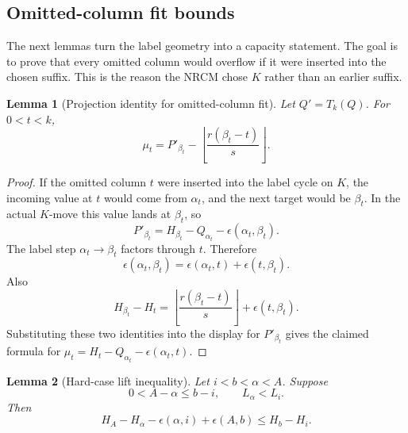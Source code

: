 \documentclass[10pt]{article}
\newtheorem{lemma}{Lemma}
\begin{document}
\subsection*{Omitted-column fit bounds}

The next lemmas turn the label geometry into a capacity statement.  The goal
is to prove that every omitted column would overflow if it were inserted into
the chosen suffix.  This is the reason the NRCM chose \(K\) rather than an
earlier suffix.

\begin{lemma}[Projection identity for omitted-column fit]
Let \(Q'=T_k(Q)\).  For \(0<t<k\),
\[
  \mu_t
  =
  P'_{\beta_t}
  -
  \left\lfloor\frac{r(\beta_t-t)}s\right\rfloor .
\]
\end{lemma}

\begin{proof}
If the omitted column \(t\) were inserted into the label cycle on \(K\), the
incoming value at \(t\) would come from \(\alpha_t\), and the next target would
be \(\beta_t\).  In the actual \(K\)-move this value lands at \(\beta_t\), so
\[
  P'_{\beta_t}
  =
  H_{\beta_t}-Q_{\alpha_t}-\epsilon(\alpha_t,\beta_t).
\]
The label step \(\alpha_t\to\beta_t\) factors through \(t\).  Therefore
\[
  \epsilon(\alpha_t,\beta_t)
  =
  \epsilon(\alpha_t,t)+\epsilon(t,\beta_t).
\]
Also
\[
  H_{\beta_t}-H_t
  =
  \left\lfloor\frac{r(\beta_t-t)}s\right\rfloor
  +
  \epsilon(t,\beta_t).
\]
Substituting these two identities into the display for \(P'_{\beta_t}\) gives
the claimed formula for \(\mu_t=H_t-Q_{\alpha_t}-\epsilon(\alpha_t,t)\).
\end{proof}

\begin{lemma}[Hard-case lift inequality]
Let \(i<b<\alpha<A\).  Suppose
\[
  0<A-\alpha\le b-i,\qquad L_\alpha<L_i.
\]
Then
\[
  H_A-H_\alpha-\epsilon(\alpha,i)+\epsilon(A,b)\le H_b-H_i.
\]
\end{lemma}
\end{document}
